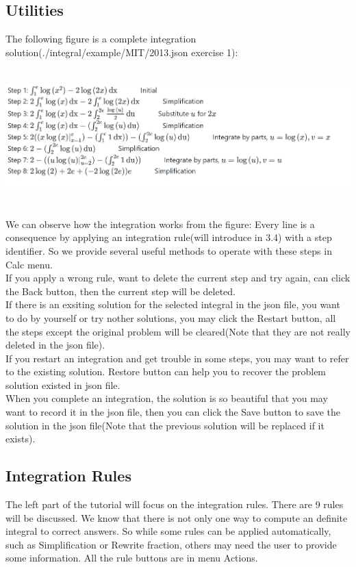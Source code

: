 \documentclass[titlepage]{article}
\begin{document}
\subsection{Utilities}
The following figure is a complete integration solution(./integral/example/MIT/2013.json exercise 1):\\
\includegraphics[width=14cm, height=6cm]{7.png}
We can observe how the integration works from the figure: Every line is a consequence by applying an integration rule(will introduce in 3.4) with a step identifier. So we provide several useful methods to operate with these steps in Calc menu.\\
If you apply a wrong rule, want to delete the current step and try again, can click the \colorbox{mygray}{Back} button, then the current step will be deleted.\\
If there is an exsiting solution for the selected integral in the json file, you want to do by yourself or try nother solutions, you may click the \colorbox{mygray}{Restart} button, all the steps except the original problem will be cleared(Note that they are not really deleted in the json file).\\
If you restart an integration and get trouble in some steps, you may want to refer to the existing solution. \colorbox{mygray}{Restore} button can help you to recover the problem solution existed in json file.\\
When you complete an integration, the solution is so beautiful that you may want to record it in the json file, then you can click the \colorbox{mygray}{Save} button to save the solution in the json file(Note that the previous solution will be replaced if it exists).
\subsection{Integration Rules}
The left part of the tutorial will focus on the integration rules. There are 9 rules will be discussed. We know that there is not only one way to compute an definite integral to correct answers. So while some rules can be applied automatically, such as Simplification or Rewrite fraction, others may need the user to provide some information. All the rule buttons are in menu Actions.
\end{document}
